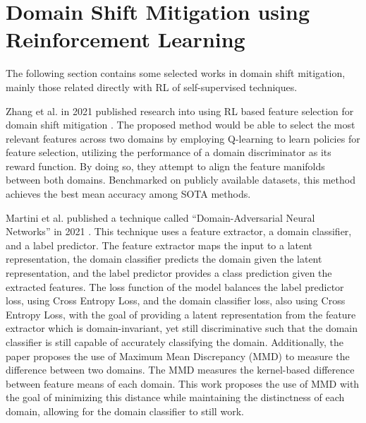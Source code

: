 \section{Domain Shift Mitigation using Reinforcement Learning}

The following section contains some selected works in domain shift mitigation, mainly those related directly with RL of self-supervised techniques.

Zhang et al. in 2021 published research into using RL based feature selection for domain shift mitigation \cite{zhang2021adversarial}.
The proposed method would be able to select the most relevant features across two domains by employing Q-learning to learn policies for feature selection, utilizing the performance of a domain discriminator as its reward function.
By doing so, they attempt to align the feature manifolds between both domains.
Benchmarked on publicly available datasets, this method achieves the best mean accuracy among SOTA methods.

Martini et al. published a technique called ``Domain-Adversarial Neural Networks'' in 2021 \cite{martini2021domain}.
This technique uses a feature extractor, a domain classifier, and a label predictor.
The feature extractor maps the input to a latent representation, the domain classifier predicts the domain given the latent representation, and the label predictor provides a class prediction given the extracted features.
The loss function of the model balances the label predictor loss, using Cross Entropy Loss, and the domain classifier loss, also using Cross Entropy Loss, with the goal of providing a latent representation from the feature extractor which is domain-invariant, yet still discriminative such that the domain classifier is still capable of accurately classifying the domain.
Additionally, the paper proposes the use of Maximum Mean Discrepancy (MMD) to measure the difference between two domains.
The MMD measures the kernel-based difference between feature means of each domain.
This work proposes the use of MMD with the goal of minimizing this distance while maintaining the distinctness of each domain, allowing for the domain classifier to still work.